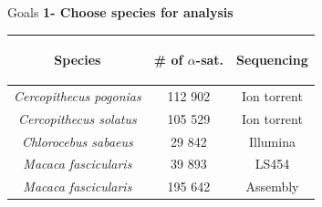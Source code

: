 \documentclass[11pt]{beamer}
\begin{document}
\begin{frame}{Goals}
\textbf{1- Choose species for analysis}

		\begin{center}
			\medbreak						
			\begin{tabular}{|c|c|c|}
			\hline
			\begin{bf}Species\end{bf} & \begin{bf}\# of $\alpha$-sat.\end{bf} & \begin{bf}Sequencing\end{bf}\\
			\hline
			\textit{Cercopithecus pogonias} & 112 902 & Ion torrent\\
			\hline
			\textit{Cercopithecus solatus} & 105 529 & Ion torrent\\
			\hline
			\textit{Chlorocebus sabaeus} & 29 842 & Illumina\\
			\hline
			\textit{Macaca fascicularis} & 39 893 & LS454\\
			\hline
			\textit{Macaca fascicularis} & 195 642 & Assembly\\
			\hline			
			\end{tabular}										
		\end{center}
\end{frame}
\end{document}
